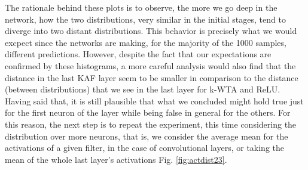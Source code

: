 \documentclass[LaM,binding=0.6cm]{./packages/sapthesis/sapthesis}
\begin{document}
        The rationale behind these plots is to observe, the more we go deep in the network, how the two distributions, very similar in the initial stages, tend to diverge into two distant distributions.
        This behavior is precisely what we would excpect since the networks are making, for the majority of the 1000 samples, different predictions. However, despite 
        the fact that our expectations are confirmed by these histograms, a more careful analysis would also find that the distance in the last KAF layer 
        seem to be smaller in comparison to the distance (between distributions) that we see in the last layer for k-WTA and ReLU. Having said that, it is still plausible 
        that what we concluded might hold true just for the first neuron of the layer while being false in general for the others. For this reason, the next step is 
        to repeat the experiment, this time considering the distribution over more neurons, that is, we consider the average mean for the activations of a given 
        filter, in the case of convolutional layers, or taking the mean of the whole last layer's activations Fig. \ref{fig:actdist23}.
\end{document}
